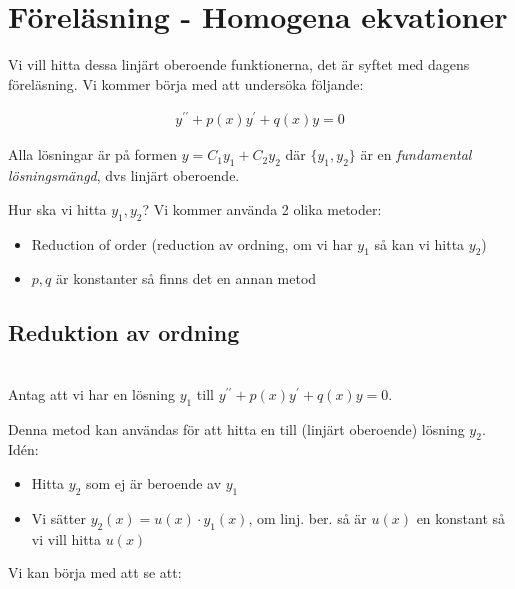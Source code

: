\section{Föreläsning - Homogena ekvationer}

\noindent Vi vill hitta dessa linjärt oberoende funktionerna, det är syftet med dagens föreläsning. Vi kommer börja med att undersöka följande:


\begin{equation*}
  \begin{gathered}
    y^{\prime\prime}+p(x)y^{\prime}+q(x)y=0
  \end{gathered}
\end{equation*}
\par\bigskip
\noindent Alla lösningar är på formen $y=C_1y_1+C_2y_2$ där $\{y_1,y_2\}$ är en \textit{fundamental lösningsmängd}, dvs linjärt oberoende.
\par\bigskip
\noindent Hur ska vi hitta $y_1, y_2$? Vi kommer använda 2 olika metoder:

\begin{itemize}
  \item Reduction of order (reduction av ordning, om vi har $y_1$ så kan vi hitta $y_2$)
  \item $p, q$ är konstanter så finns det en annan metod
\end{itemize}
\par\bigskip

\subsection{Reduktion av ordning}\hfill\\

\noindent Antag att vi har en lösning $y_1$ till $y^{\prime\prime}+p(x)y^{\prime}+q(x)y=0$.
\par\bigskip
\noindent Denna metod kan användas för att hitta en till (linjärt oberoende) lösning $y_2$. Idén:

\begin{itemize}
  \item Hitta $y_2$ som ej är beroende av $y_1$
  \item Vi sätter $y_2(x)=u(x)\cdot y_1(x)$, om linj. ber. så är $u(x)$ en konstant så vi vill hitta $u(x)$
\end{itemize}
\par\bigskip
\noindent Vi kan börja med att se att:


